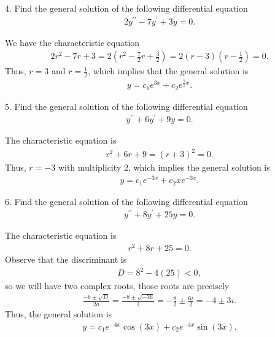 \documentclass{report}
\begin{document}
    \bigbreak \noindent 
    \begin{mdframed}
        4. Find the general solution of the following differential equation
        \begin{align*}
            2y^{\prime\prime} - 7y^{\prime} + 3y = 0
        .\end{align*}
    \end{mdframed}
    \bigbreak \noindent 
    We have the characteristic equation
    \begin{align*}
        2r^{2}- 7r + 3  = 2\left(r^{2}-\frac{7}{2}r + \frac{3}{2}\right) = 2(r-3)\left(r-\frac{1}{2}\right)= 0
    .\end{align*}
    Thus, $r=3$ and $r=\frac{1}{2}$, which implies that the general solution is
    \begin{align*}
        y = c_{1}e^{3x} + c_{2}e^{\frac{1}{2}x}
    .\end{align*}

    \bigbreak \noindent 
    \begin{mdframed}
        5. Find the general solution of the following differential equation
        \begin{align*}
            y^{\prime\prime} + 6y^{\prime} + 9y = 0
        .\end{align*}
    \end{mdframed}
    \bigbreak \noindent 
    The characteristic equation is 
    \begin{align*}
        r^{2} + 6r + 9 = (r+3)^{2} = 0
    .\end{align*}
    Thus, $r=-3$ with multiplicity $2$, which implies the general solution is
    \begin{align*}
        y = c_{1}e^{-3x}  +c_{2}xe^{-3x}
    .\end{align*}

    \bigbreak \noindent 
    \begin{mdframed}
        6. Find the general solution of the following differential equation
        \begin{align*}
            y^{\prime\prime} + 8y^{\prime} + 25y = 0
        .\end{align*}
    \end{mdframed}
    \bigbreak \noindent 
    The characteristic equation is 
    \begin{align*}
        r^{2} + 8r + 25 =0
    .\end{align*}
    Observe that the discriminant is 
    \begin{align*}
        D = 8^{2}-4(25) < 0
    ,\end{align*}
    so we will have two complex roots, those roots are precisely
    \begin{align*}
        \frac{-b\pm\sqrt{D}}{2a} = \frac{-8\pm \sqrt{-36}}{2} = -\frac{8}{2} \pm \frac{6i}{2} = -4\pm 3i
    .\end{align*}
    Thus, the general solution is
    \begin{align*}
        y = c_{1}e^{-4x}\cos{\left(3x\right)} + c_{2}e^{-4x}\sin{\left(3x\right)}
    .\end{align*}
\end{document}
